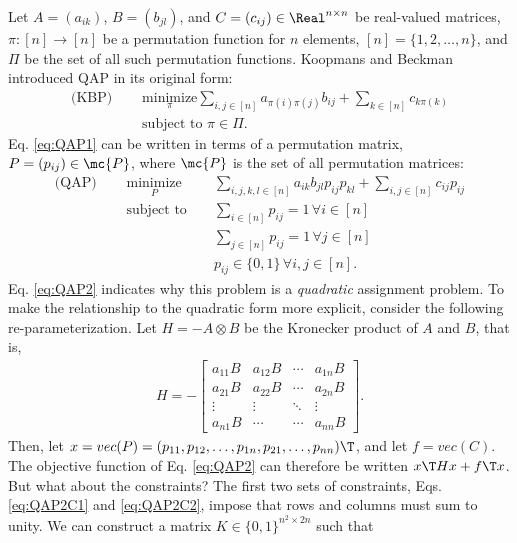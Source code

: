 \documentclass[10pt,journal,cspaper,compsoc]{IEEEtran}
\begin{document}
Let $A=(a_{ik})$,  $B=(b_{jl})$, and $C=(c_{ij})  \in \Real^{n \times n}$ be real-valued matrices,  $\pi \colon [n] \to [n]$ be a permutation function for $n$ elements, $[n]=\{1,2,\ldots,n\}$, and $\Pi$ be the set of all such permutation functions.    Koopmans and Beckman \cite{Koopmans1957} introduced QAP in its original form:
\begin{subequations} \label{eq:QAP1}
\begin{align}
	\text{(KBP) } \quad &\underset{\pi}{\text{minimize}}  \sum_{i,j \in [n]} a_{\pi(i)\pi(j)} b_{ij}  + \sum_{k \in [n]} c_{k\pi(k)} \\
	&\text{subject to }  \pi \in \Pi.
\end{align}
\end{subequations}
Eq. \eqref{eq:QAP1} can be written in terms of a permutation matrix, $P=(p_{ij}) \in \mc{P}$, where $\mc{P}$ is the set of all permutation matrices:
\begin{subequations} \label{eq:QAP2}
\begin{align}
	\text{(QAP) } \quad &\underset{P}{\text{minimize}}  &&\sum_{i,j,k,l \in [n]} a_{ik} b_{jl} p_{ij}p_{kl}  + \sum_{i,j \in [n]} c_{ij}p_{ij} \\
	&\text{subject to } && \sum_{i \in [n]} p_{ij} = 1 \, \forall i\in[n]  \label{eq:QAP2C1}\\
	&&& \sum_{j \in [n]} p_{ij} = 1 \, \forall j\in[n]  \label{eq:QAP2C2}\\
	&&&p_{ij} \in \{0,1\} \, \forall i,j \in [n]. \label{eq:QAP2C3}
\end{align}
\end{subequations}
Eq. \eqref{eq:QAP2} indicates why this problem is a \emph{quadratic} assignment problem.  To make the relationship to the quadratic form more explicit, consider the following re-parameterization.  Let $H=-A \otimes B$ be the Kronecker product of $A$ and $B$, that is,
\begin{align}
	H=-
\begin{bmatrix}
a_{11} B & a_{12} B &\cdots& a_{1n} B \\
a_{21} B & 	a_{22}B & \cdots & a_{2n} B \\
\vdots & \vdots & \ddots & \vdots \\
a_{n1} B & \cdots & \cdots & a_{nn} B
\end{bmatrix}.
\end{align}
Then, let $x=vec(P)=(p_{11}, p_{12}, \ldots, p_{1n}, p_{21}, \ldots, p_{nn})\T$, and let $f=vec(C)$.  The objective function of Eq. \eqref{eq:QAP2} can therefore be written $x\T H x + f\T x$.  But what about the constraints?  The first two sets of constraints, Eqs. \eqref{eq:QAP2C1} and \eqref{eq:QAP2C2}, impose that rows and columns must sum to unity.  We can construct a matrix $K \in \{0,1\}^{n^2 \times 2n}$ such that
\end{document}
